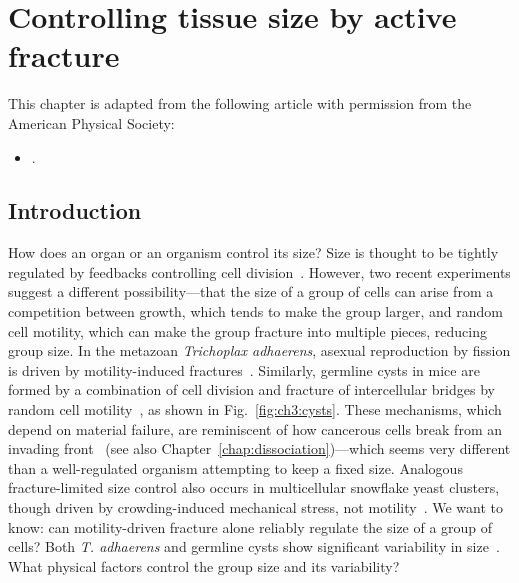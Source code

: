 \chapter{Controlling tissue size by active fracture}
\label{chap:size-control}

\begin{singlespace}
    This chapter is adapted from the following article with permission from the American Physical Society:
    \begin{itemize}
        \item {}.
    \end{itemize}
\end{singlespace}


\section{Introduction}
\label{sec:ch3:intro}

How does an organ or an organism control its size? Size is thought to be tightly regulated by feedbacks controlling cell division~\cite{lecuit2007orchestrating}. However, two recent experiments suggest a different possibility---that the size of a group of cells can arise from a competition between growth, which tends to make the group larger, and random cell motility, which can make the group fracture into multiple pieces, reducing group size. In the metazoan \textit{Trichoplax adhaerens}, asexual reproduction by fission is driven by motility-induced fractures~\cite{prakash2021motility}. Similarly, germline cysts in mice are formed by a combination of cell division and fracture of intercellular bridges by random cell motility~\cite{levy2024tug}, as shown in Fig.~\ref{fig:ch3:cysts}. These mechanisms, which depend on material failure, are reminiscent of how cancerous cells break from an invading front~\cite{mukherjee2021cluster,law2023cytokinesis,wang2025confinement} (see also Chapter~\ref{chap:dissociation})---which seems very different than a well-regulated organism attempting to keep a fixed size. Analogous fracture-limited size control also occurs in multicellular snowflake yeast clusters, though driven by crowding-induced mechanical stress, not motility~\cite{jacobeen2018cellular}. We want to know: can motility-driven fracture alone reliably regulate the size of a group of cells? Both \textit{T. adhaerens} and germline cysts show significant variability in size~\cite{prakash2021motility,levy2024tug,ikami2023branched,lei2013mouse}. What physical factors control the group size and its variability?

